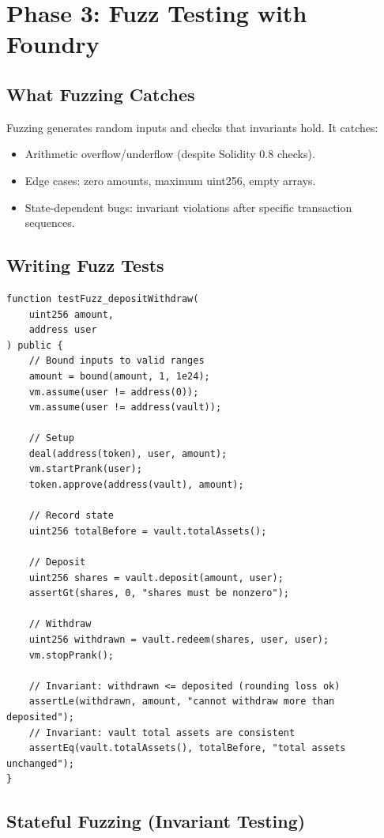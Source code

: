 \section{Phase 3: Fuzz Testing with Foundry}


\subsection{What Fuzzing Catches}

Fuzzing generates random inputs and checks that invariants hold. It catches:
\begin{itemize}[nosep]
  \item Arithmetic overflow/underflow (despite Solidity 0.8 checks).
  \item Edge cases: zero amounts, maximum uint256, empty arrays.
  \item State-dependent bugs: invariant violations after specific transaction sequences.
\end{itemize}

\subsection{Writing Fuzz Tests}

\begin{lstlisting}[language=Solidity,caption={Foundry fuzz test example}]
function testFuzz_depositWithdraw(
    uint256 amount,
    address user
) public {
    // Bound inputs to valid ranges
    amount = bound(amount, 1, 1e24);
    vm.assume(user != address(0));
    vm.assume(user != address(vault));

    // Setup
    deal(address(token), user, amount);
    vm.startPrank(user);
    token.approve(address(vault), amount);

    // Record state
    uint256 totalBefore = vault.totalAssets();

    // Deposit
    uint256 shares = vault.deposit(amount, user);
    assertGt(shares, 0, "shares must be nonzero");

    // Withdraw
    uint256 withdrawn = vault.redeem(shares, user, user);
    vm.stopPrank();

    // Invariant: withdrawn <= deposited (rounding loss ok)
    assertLe(withdrawn, amount, "cannot withdraw more than deposited");
    // Invariant: vault total assets are consistent
    assertEq(vault.totalAssets(), totalBefore, "total assets unchanged");
}
\end{lstlisting}

\subsection{Stateful Fuzzing (Invariant Testing)}

